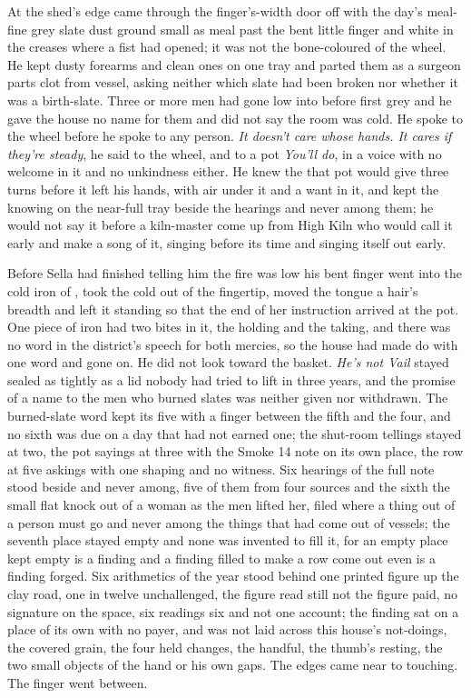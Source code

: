 At the shed's edge  came through the finger's-width door off  with the day's meal-fine grey slate dust ground small as meal past the bent little finger and white in the creases where a fist had opened; it was not the bone-coloured  of the wheel. He kept dusty forearms and clean ones on one tray and parted them as a surgeon parts clot from vessel, asking neither which slate had been broken nor whether it was a birth-slate. Three or more men had gone low into  before first grey and he gave the house no name for them and did not say the room was cold. He spoke to the wheel before he spoke to any person. \emph{It doesn't care whose hands. It cares if they're steady}, he said to the wheel, and to a pot \emph{You'll do}, in a voice with no welcome in it and no unkindness either. He knew the  that pot would give three turns before it left his hands, with air under it and a want in it, and kept the knowing on the near-full tray beside the hearings and never among them; he would not say it before a kiln-master come up from High Kiln who would call it early and make a song of it, singing before its time and singing itself out early.

Before Sella had finished telling him the fire was low his bent finger went into the cold iron of , took the cold out of the fingertip, moved the tongue a hair's breadth and left it standing so that the end of her instruction arrived at the pot. One piece of iron had two bites in it, the holding and the taking, and there was no word in the district's speech for both mercies, so the house had made do with one word and gone on. He did not look toward the basket. \emph{He's not Vail} stayed sealed as tightly as a lid nobody had tried to lift in three years, and the promise of a name to the men who burned slates was neither given nor withdrawn. The burned-slate word kept its five with a finger between the fifth and the four, and no sixth was due on a day that had not earned one; the shut-room tellings stayed at two, the pot sayings at three with the Smoke 14 note on its own place, the row at five askings with one shaping and no witness. Six hearings of the full note stood beside and never among, five of them from four sources and the sixth the small flat knock out of a woman as the men lifted her, filed where a thing out of a person must go and never among the things that had come out of vessels; the seventh place stayed empty and none was invented to fill it, for an empty place kept empty is a finding and a finding filled to make a row come out even is a finding forged. Six arithmetics of the year stood behind one printed figure up the clay road, one in twelve unchallenged, the figure read still not the figure paid, no signature on the space, six readings six and not one account; the finding sat on a place of its own with no payer, and was not laid across this house's not-doings, the covered grain, the four held changes, the handful, the thumb's resting, the two small objects of the hand or his own gaps. The edges came near to touching. The finger went between.

